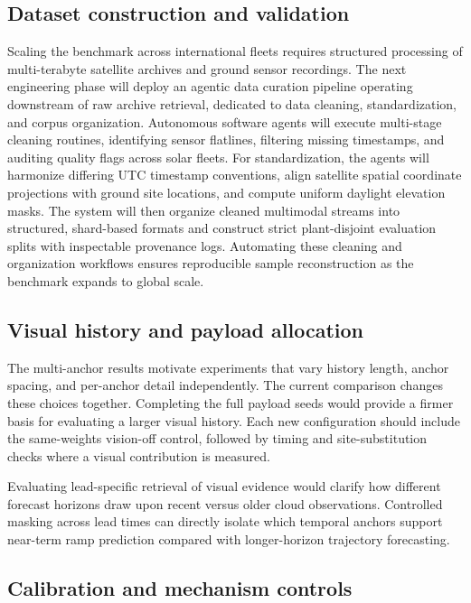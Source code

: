 \subsection{Dataset construction and validation}

Scaling the benchmark across international fleets requires structured processing of multi-terabyte satellite archives and ground sensor recordings. The next engineering phase will deploy an agentic data curation pipeline operating downstream of raw archive retrieval, dedicated to data cleaning, standardization, and corpus organization. Autonomous software agents will execute multi-stage cleaning routines, identifying sensor flatlines, filtering missing timestamps, and auditing quality flags across solar fleets. For standardization, the agents will harmonize differing UTC timestamp conventions, align satellite spatial coordinate projections with ground site locations, and compute uniform daylight elevation masks. The system will then organize cleaned multimodal streams into structured, shard-based formats and construct strict plant-disjoint evaluation splits with inspectable provenance logs. Automating these cleaning and organization workflows ensures reproducible sample reconstruction as the benchmark expands to global scale.

\subsection{Visual history and payload allocation}

The multi-anchor results motivate experiments that vary history length, anchor spacing, and per-anchor detail independently. The current comparison changes these choices together. Completing the full payload seeds would provide a firmer basis for evaluating a larger visual history. Each new configuration should include the same-weights vision-off control, followed by timing and site-substitution checks where a visual contribution is measured.

Evaluating lead-specific retrieval of visual evidence would clarify how different forecast horizons draw upon recent versus older cloud observations. Controlled masking across lead times can directly isolate which temporal anchors support near-term ramp prediction compared with longer-horizon trajectory forecasting.

\subsection{Calibration and mechanism controls}

